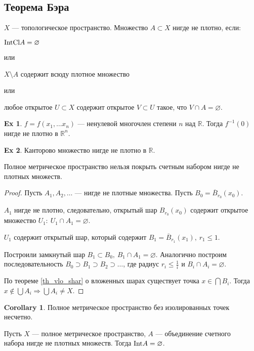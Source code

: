 \documentclass[11pt]{book}
\newcommand{\R}{\mathbb{R}}
\newcommand{\Cl}{{\mathop{\text{\rm Cl}}}}
\newcommand{\Int}{{\mathop{\text{\rm Int}}}}
\renewcommand{\le}{\leqslant}
\theoremstyle{definition}
\theoremstyle{plain}
\theoremstyle{plain}
\theoremstyle{definition}
\newtheorem*{ex}{Ex}
\newtheorem*{cor}{Corollary}
\theoremstyle{remark}
\begin{document}
\subsection{Теорема Бэра}
\begin{defn}
    $ X$ ---  топологическое пространство. Множество $ A \subset X$ нигде не плотно, если:
    \begin{description}
	\item $ \Int \Cl A = \varnothing$
    \end{description}
    или
    \begin{description}
	\item $X \setminus A$ содержит всюду плотное множество
    \end{description}
    или
    \begin{description}
	\item любое открытое $ U \subset X$ содержит  открытое $ V \subset U$ такое, что $ V \cap A = \varnothing$.
    \end{description}
\end{defn}
\begin{ex}
    $ f = f(x_1, \ldots x_n)$ --- ненулевой многочлен степени $ n$ над  $ \R$. Тогда  $ f^{-1}(0)$ нигде не плотно в $ \R^{n} $.
\end{ex}
\begin{ex}
    Канторово множество нигде не плотно в $ \R$.
\end{ex}
\begin{thm}[Бэр]
    Полное метрическое пространство нельзя покрыть счетным набором нигде не плотных множеств.
\end{thm}
\begin{proof}
    Пусть $ A_1, A_2, \ldots $ --- нигде не плотные множества.
    Пусть $ B_0 = \overline{B}_{r_0}(x_0)$.

    $ A_1$ нигде не плотно, следовательно, открытый шар $ B_{r_0}(x_0)$ содержит открытое множество $ U_1: ~ U_1 \cap A_1 = \varnothing$.

    $ U_1$ содержит открытый шар, который содержит $ B_1 = \overline{B}_{r_1}(x_1), ~ r_1 \le  1$.

    Построили замкнутый шар $ B_1 \subset B_0, ~ B_1 \cap A_1 = \varnothing$.
    Аналогично построим последовательность $ B_0 \supset B_1 \supset B_2 \supset \ldots $, где радиус $  r_i \le \frac{1}{i}$ и $ B_i \cap A_i = \varnothing$.

    По теореме \ref{th_vlo_shar} о вложенных шарах существует точка $ x \in  \bigcap B_i $. Тогда $ x \not\in \bigcup A_i  \Longrightarrow  \bigcup A_i \ne X$.
\end{proof}
\begin{cor}
    Полное метрическое пространство без изолированных точек несчетно.
\end{cor}
\begin{thm}
    Пусть $ X$ --- полное метрическое пространство,  $ A$ --- объединение счетного набора нигде не плотных множеств. Тогда  $ \Int A = \varnothing$.
\end{thm}
\end{document}
